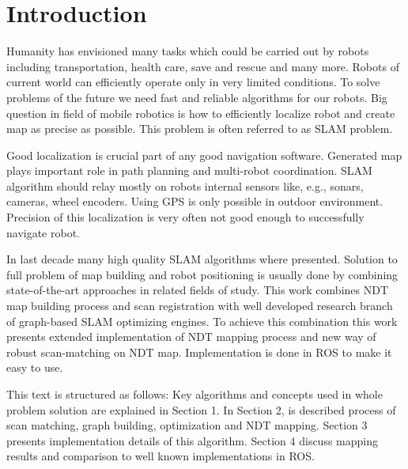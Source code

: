 \chapter*{Introduction}
Humanity has envisioned many tasks which could be carried out by robots including transportation, health care, save and rescue and many more. Robots of current world can efficiently operate only in very limited conditions. To solve problems of the future we need fast and reliable algorithms for our robots. Big question in field of mobile robotics is how to efficiently localize robot and create map as precise as possible. This problem is often referred to as \gls{SLAM} problem.

Good localization is crucial part of any good navigation software. Generated map plays important role in path planning and  multi-robot coordination. SLAM algorithm should relay mostly on robots internal sensors like, e.g., sonars, cameras, wheel encoders. Using \gls{GPS} is only possible in outdoor environment. Precision of this localization is very often not good enough to successfully navigate robot.

In last decade many high quality \gls{SLAM} algorithms where presented. Solution to full problem of map building and robot positioning is usually done by combining state-of-the-art approaches in related fields of study. This work combines \gls{NDT} map building process and scan registration with well developed research branch of graph-based \gls{SLAM} optimizing engines. To achieve this combination this work presents extended implementation of \gls{NDT} mapping process and new way of robust scan-matching on \gls{NDT} map. Implementation is done in \gls{ROS} to make it easy to use.

This text is structured as follows: Key algorithms and concepts used in whole problem solution are explained in Section 1. In Section 2, is described process of scan matching, graph building, optimization and NDT mapping. Section 3 presents implementation details of this algorithm. Section 4 discuss mapping results and comparison to well known implementations in ROS.  

